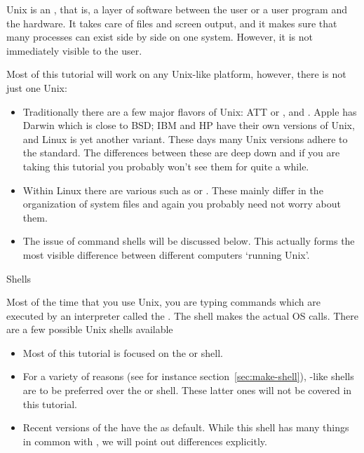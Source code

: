 
\lstset{language=bash}

Unix is an , that is, a layer of software
between the user or a user program and the hardware. It takes care of
files and screen output, and it makes sure that many processes can exist
side by side on one system. However, it is not immediately visible to
the user.

Most of this tutorial will work on any Unix-like platform,
however, there is not just one Unix:
\begin{itemize}
\item Traditionally there are a few major flavors of Unix:
  ATT or , and .
  Apple has Darwin which is close to BSD; IBM and HP have their own
  versions of Unix, and Linux is yet another variant.
  These days many Unix versions adhere to the  standard.
  The differences between
  these are deep down and if you are taking this tutorial you probably
  won't see them for quite a while.
\item Within Linux there are various 
  such as  or . These mainly differ
  in the organization of system files and again you probably need not worry
  about them.
\item The issue of command shells will be discussed below.
  This actually forms the most visible difference between different
  computers `running Unix'.
\end{itemize}


 {Shells}

Most of the time that you use Unix, you are typing commands which are
executed by an interpreter called the . The shell
makes the actual \ac{OS} calls. There are a few possible Unix shells
available
\begin{itemize}
\item Most of this tutorial is focused on the
   or  shell.
\item For a variety of reasons (see for instance section~\ref{sec:make-shell}),
  -like shells are to be preferred over the
   or  shell. These latter ones will not be covered
  in this tutorial.
\item Recent versions of the 
  have the  as default.
  While this shell has many things in common with ,
  we will point out differences explicitly.
\end{itemize}

